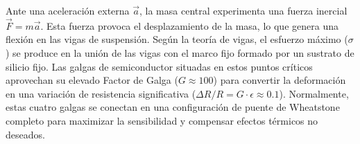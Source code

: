 \begin{marginfigure}
    \centering
    \caption[Integración de la galga en el silicio]{Integración de la galga en el silicio. La zona roja es la que cambia su resistividad ante la flexión del sustrato.}\label{fig:zona_dopada}
\end{marginfigure}

Ante una aceleración externa $\vec{a}$, la masa central experimenta una fuerza inercial $\vec{F}=m\vec{a}$. Esta fuerza provoca el desplazamiento de la masa, lo que genera una flexión en las vigas de suspensión. Según la teoría de vigas, el esfuerzo máximo ($\sigma$) se produce en la unión de las vigas con el marco fijo formado por un sustrato de silicio fijo. Las galgas de semiconductor situadas en estos puntos críticos aprovechan su elevado Factor de Galga ($G \approx 100$) para convertir la deformación en una variación de resistencia significativa ($\Delta R/R = G \cdot \epsilon \approx 0.1$). Normalmente, estas cuatro galgas se conectan en una configuración de puente de Wheatstone completo para maximizar la sensibilidad y compensar efectos térmicos no deseados.

